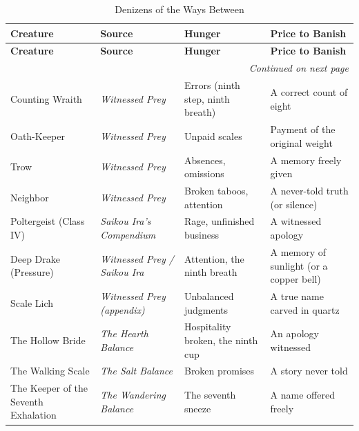 \begin{longtable}{p{} p{} p{} p{}}
\caption{Denizens of the Ways Between}\\
\hline
\textbf{Creature} & \textbf{Source} & \textbf{Hunger} & \textbf{Price to Banish} \\
\hline
\endfirsthead
\hline
\textbf{Creature} & \textbf{Source} & \textbf{Hunger} & \textbf{Price to Banish} \\
\hline
\endhead
\hline
\multicolumn{4}{r}{\textit{Continued on next page}} \\
\endfoot
\hline
\endlastfoot
Counting Wraith & \textit{Witnessed Prey} & Errors (ninth step, ninth breath) & A correct count of eight \\
Oath-Keeper & \textit{Witnessed Prey} & Unpaid scales & Payment of the original weight \\
Trow & \textit{Witnessed Prey} & Absences, omissions & A memory freely given \\
Neighbor & \textit{Witnessed Prey} & Broken taboos, attention & A never-told truth (or silence) \\
Poltergeist (Class IV) & \textit{Saikou Ira's Compendium} & Rage, unfinished business & A witnessed apology \\
Deep Drake (Pressure) & \textit{Witnessed Prey / Saikou Ira} & Attention, the ninth breath & A memory of sunlight (or a copper bell) \\
Scale Lich & \textit{Witnessed Prey (appendix)} & Unbalanced judgments & A true name carved in quartz \\
The Hollow Bride & \textit{The Hearth Balance} & Hospitality broken, the ninth cup & An apology witnessed \\
The Walking Scale & \textit{The Salt Balance} & Broken promises & A story never told \\
The Keeper of the Seventh Exhalation & \textit{The Wandering Balance} & The seventh sneeze & A name offered freely \\
\end{longtable}

